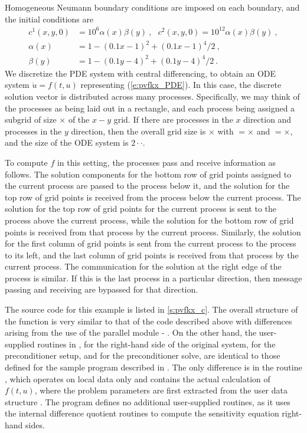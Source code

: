Homogeneous Neumann boundary conditions are imposed on each boundary, and the
initial conditions are 
\begin{equation} \label{e:pvfkx_IC}
  \begin{split}
  c^{1}(x,y,0) &= 10^{6}\alpha (x)\beta (y) ~,~~~ 
                    c^{2}(x,y,0)=10^{12}\alpha(x)\beta (y) ~, \\
  \alpha (x) &= 1-(0.1x-1)^{2}+(0.1x-1)^{4}/2 ~, \\
  \beta (y) &= 1-(0.1y-4)^{2}+(0.1y-4)^{4}/2 ~.
  \end{split} 
\end{equation}
We discretize the PDE system with central differencing, to
obtain an ODE system ${\dot u} = f(t,u)$ representing (\ref{e:pvfkx_PDE}).  
In this case, the discrete solution vector is distributed across
many processes.  Specifically, we may think of the processes as
being laid out in a rectangle, and each process being assigned a
subgrid of size $\times$ of the $x-y$ grid. If
there are  processes in the $x$ direction and 
processes in the $y$ direction, then the overall grid size is
$\times$ with $=$$\times$ and
$=$$\times$, and the size of the ODE system is
$2\cdot$$\cdot$.  

To compute $f$ in this setting, the processes pass and receive
information as follows.  The solution components for the bottom row of
grid points assigned to the current process are passed to the process below
it, and the solution for the top row of grid points is received from
the process below the current process. The solution for the top
row of grid points for the current process is sent to the process
above the current process, while the solution for the bottom row of
grid points is received from that process by the current
process. Similarly, the solution for the first column of grid points
is sent from the current process to the process to its left, and
the last column of grid points is received from that process by the
current process. The communication for the solution at the right
edge of the process is similar. If this is the last process in a
particular direction, then message passing and receiving are bypassed
for that direction.

The source code for this example is listed in \A\ref{s:pvfkx_c}.
The overall structure of the  function is very
similar to that of the code  described above with 
differences arising from the use of the parallel {\nvector} module - {\nvecp}.
On the other hand, the user-supplied routines in ,
 for the right-hand side of the original system,
 for the preconditioner setup, and  for the
preconditioner solve, are identical to those defined for the sample program
 described in \cite{cvode2.2.0_ex}. The only difference is in the
routine , which operates on local data only and contains the actual 
calculation of $f(t,u)$, where the problem parameters are first extracted from
the user data structure . The program  defines no additional
user-supplied routines, as it uses the {\cvodes} internal difference quotient routines 
to compute the sensitivity equation right-hand sides.

